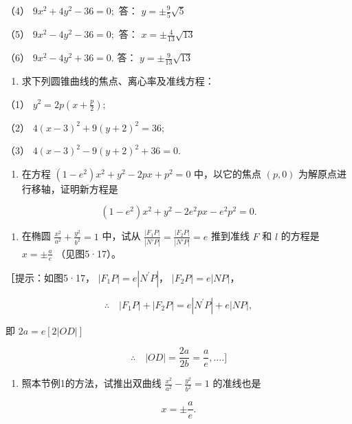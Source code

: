 （4） \(9x^{2} + 4y^{2} - 36 = 0;\) 答： \(y=\pm\frac{9}{5}\sqrt{5}\)

（5） \(9x^{2} - 4y^{2} - 36 = 0;\) 答：
\(x = \pm \frac{4}{13}\sqrt{13}\)

（6） \(9x^{2} - 4y^{2} + 36 = 0.\) 答： \(y=\pm\frac{9}{13}\sqrt{13}\)

\begin{enumerate}
\def\labelenumi{\arabic{enumi}.}
\tightlist
\item
  求下列圆锥曲线的焦点、离心率及准线方程：
\end{enumerate}

（1） \(y^{2}=2p\left(x+\frac{p}{2}\right);\)

（2） \(4(x - 3)^{2} + 9(y + 2)^{2} = 36;\)

（3） \(4(x - 3)^{2} - 9(y + 2)^{2} + 36 = 0.\)

\begin{enumerate}
\def\labelenumi{\arabic{enumi}.}
\setcounter{enumi}{1}
\tightlist
\item
  在方程 \((1 - e^2)x^2 + y^2 - 2px + p^2 = 0\) 中，以它的焦点
  \((p, 0)\) 为解原点进行移轴，证明新方程是
\end{enumerate}

\[
(1 - e^{2}) x^{2} + y^{2} - 2 e^{2} p x - e^{2} p^{2} = 0.
\]

\begin{enumerate}
\def\labelenumi{\arabic{enumi}.}
\setcounter{enumi}{2}
\tightlist
\item
  在椭圆 \(\frac{x^2}{a^2} + \frac{y^2}{b^2} = 1\) 中，试从
  \(\frac{|F_1P|}{|N'P|} = \frac{|F_2P|}{|N'P|} = e\) 推到准线 \(F\) 和
  \(l\) 的方程是 \(x = \pm \frac{a}{e}\) （见图5·17）。
\end{enumerate}

［提示：如图5·17， \(|F_{1}P|=e|N^{\prime}P|\)， \(|F_{2}P|=e|NP|\)，

\[
\therefore \quad | F_{1} P | + | F_{2} P | = e | N^{\prime} P | + e | NP |,
\]

即 \(2a = e[2|OD|]\)

\[
\therefore \quad | OD | = \frac {2 a}{2 b} = \frac {a}{e}, \dots. ]
\]

\begin{enumerate}
\def\labelenumi{\arabic{enumi}.}
\setcounter{enumi}{3}
\tightlist
\item
  照本节例1的方法，试推出双曲线
  \(\frac{x^2}{a^2} - \frac{y^2}{b^2} = 1\) 的准线也是
\end{enumerate}

\[
x = \pm \frac {a}{e}.
\]

